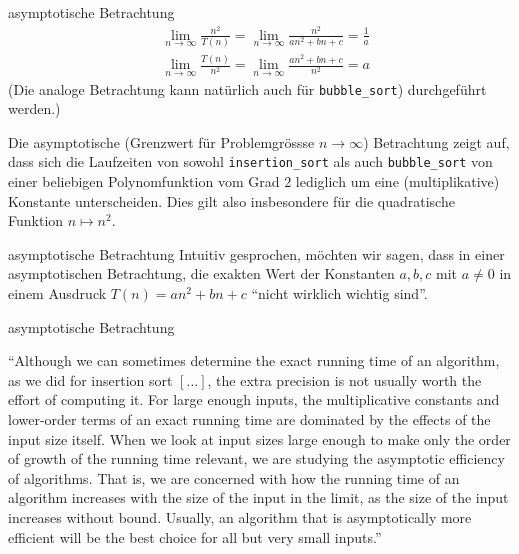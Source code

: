 \begin{frame}{asymptotische Betrachtung}
	\begin{align*}
		 & \lim_{n\to\infty}\frac{n^2}{T(n)} = \lim_{n\to\infty}\frac{n^2}{an^2 + bn + c} =\frac{1}{a}
	\end{align*}
	\begin{align*}
		 & \lim_{n\to\infty}\frac{T(n)}{n^2} = \lim_{n\to\infty}\frac{an^2 + bn + c}{n^2} = a
	\end{align*}
	(Die analoge Betrachtung kann natürlich auch für \texttt{bubble\_sort}) durchgeführt werden.)
	
	\vspace{\baselineskip}
	Die asymptotische (Grenzwert für Problemgrössse $n\to\infty$) Betrachtung zeigt auf, dass sich die Laufzeiten von sowohl \texttt{insertion\_sort} als auch \texttt{bubble\_sort} von einer beliebigen Polynomfunktion vom Grad $2$ lediglich um eine (multiplikative) Konstante unterscheiden. Dies gilt also insbesondere für die quadratische Funktion $n\mapsto n^2$.
\end{frame}

\begin{frame}{asymptotische Betrachtung}
	Intuitiv gesprochen, möchten wir sagen, dass in einer asymptotischen Betrachtung, die exakten Wert der Konstanten $a, b, c$ mit $a\neq 0$ in einem Ausdruck $T(n) = an^2 + bn + c$ \enquote{nicht wirklich wichtig sind}.
\end{frame}

\begin{frame}{asymptotische Betrachtung}
	\begin{center}
		{\small
\enquote{Although we can sometimes determine the exact running time of an algorithm, as we did for insertion
sort $[\ldots ]$, the extra precision is not usually worth the effort of computing
it. For large enough inputs, the multiplicative constants and lower-order terms of
an exact running time are dominated by the effects of the input size itself.
When we look at input sizes large enough to make only the order of growth of
the running time relevant, we are studying the asymptotic efficiency of algorithms.
That is, we are concerned with how the running time of an algorithm increases with
the size of the input in the limit, as the size of the input increases without bound.
Usually, an algorithm that is asymptotically more efficient will be the best choice
for all but very small inputs.}
		}
	\end{center}
\end{frame}

